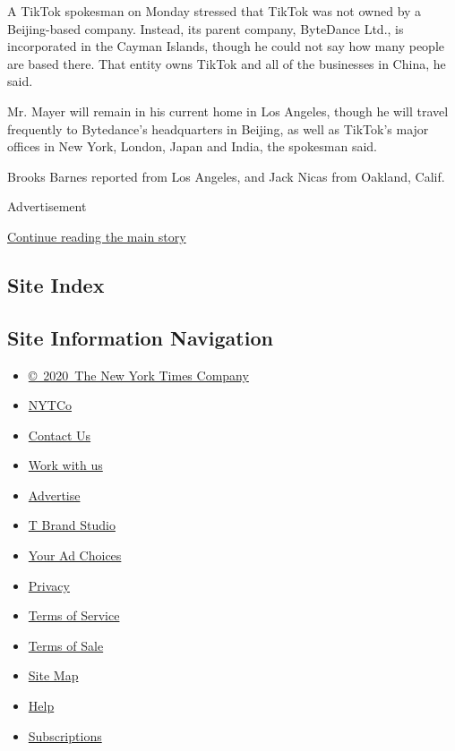 A TikTok spokesman on Monday stressed that TikTok was not owned by a
Beijing-based company. Instead, its parent company, ByteDance Ltd., is
incorporated in the Cayman Islands, though he could not say how many
people are based there. That entity owns TikTok and all of the
businesses in China, he said.

Mr. Mayer will remain in his current home in Los Angeles, though he will
travel frequently to Bytedance's headquarters in Beijing, as well as
TikTok's major offices in New York, London, Japan and India, the
spokesman said.

Brooks Barnes reported from Los Angeles, and Jack Nicas from Oakland,
Calif.

Advertisement

\protect\hyperlink{after-bottom}{Continue reading the main story}

\hypertarget{site-index}{%
\subsection{Site Index}\label{site-index}}

\hypertarget{site-information-navigation}{%
\subsection{Site Information
Navigation}\label{site-information-navigation}}

\begin{itemize}
\tightlist
\item
  \href{https://help.nytimes3xbfgragh.onion/hc/en-us/articles/115014792127-Copyright-notice}{©~2020~The
  New York Times Company}
\end{itemize}

\begin{itemize}
\tightlist
\item
  \href{https://www.nytco.com/}{NYTCo}
\item
  \href{https://help.nytimes3xbfgragh.onion/hc/en-us/articles/115015385887-Contact-Us}{Contact
  Us}
\item
  \href{https://www.nytco.com/careers/}{Work with us}
\item
  \href{https://nytmediakit.com/}{Advertise}
\item
  \href{http://www.tbrandstudio.com/}{T Brand Studio}
\item
  \href{https://www.nytimes3xbfgragh.onion/privacy/cookie-policy\#how-do-i-manage-trackers}{Your
  Ad Choices}
\item
  \href{https://www.nytimes3xbfgragh.onion/privacy}{Privacy}
\item
  \href{https://help.nytimes3xbfgragh.onion/hc/en-us/articles/115014893428-Terms-of-service}{Terms
  of Service}
\item
  \href{https://help.nytimes3xbfgragh.onion/hc/en-us/articles/115014893968-Terms-of-sale}{Terms
  of Sale}
\item
  \href{https://spiderbites.nytimes3xbfgragh.onion}{Site Map}
\item
  \href{https://help.nytimes3xbfgragh.onion/hc/en-us}{Help}
\item
  \href{https://www.nytimes3xbfgragh.onion/subscription?campaignId=37WXW}{Subscriptions}
\end{itemize}
